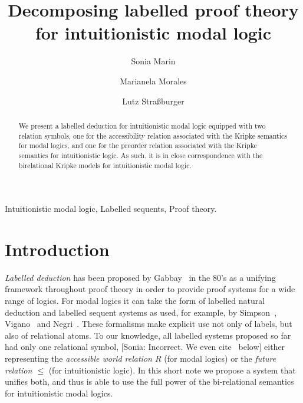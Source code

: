\documentclass[twoside]{aiml18}
\newcommand{\sonia}[1]{{\color{blue}[Sonia: #1]}}
\begin{document}
\begin{frontmatter}
  \title{Decomposing labelled proof theory for intuitionistic modal logic}
  \author{Sonia Marin}
  \address{IT-Universitetet i K{\o}benhavn \\ Denmark }
 \author{Marianela Morales}
 \address{Universidad Nacional de C\'ordoba \\ Argentina}
   \author{Lutz Stra{\ss}burger}
 \address{Inria Saclay \& LIX, \'Ecole Polytechnique \\ France}

 \begin{abstract}
   We present a labelled deduction for intuitionistic modal logic equipped 
   with two relation symbols, one for the accessibility
   relation associated with the Kripke semantics for modal logics, and
   one for the preorder relation associated with the Kripke semantics
   for intuitionistic logic. 
   As such, it is in close
   correspondence with the birelational Kripke models for intuitionistic modal logic.


  \end{abstract}

  \begin{keyword}
  Intuitionistic modal logic, Labelled sequents, Proof theory.
  \end{keyword}
 \end{frontmatter}


\section{Introduction}

\emph{Labelled deduction} has been proposed by Gabbay~\cite{Gabbay} in the 80's as a unifying framework throughout proof theory in order to provide proof
systems for a wide range of logics. 
%
For modal logics it can take
the form of labelled natural deduction and labelled sequent systems as
used, for example, by Simpson~\cite{Simpson}, Vigano~\cite{Vigano} and
Negri~\cite{Negri}. 
%
These formalisms make explicit use not only of
labels, but also of relational atoms. 
%
To our knowledge, all labelled
systems proposed so far had only one relational symbol, 
\sonia{Incorrect. We even cite~\cite{Maffezioli} below}
either representing the \emph{accessible world relation $R$} (for modal
logics) or the \emph{future relation $\le$} (for intuitionistic
logic). 
%
In this short note we propose a system that unifies both, and
thus is able to use the full power of the bi-relational semantics for
intuitionistic modal logics.
\end{document}
